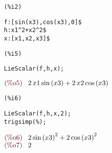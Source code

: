 \noindent
\begin{minipage}[t]{8ex}
\color{red}\bf
\begin{verbatim}
(%i2) 
\end{verbatim}
\end{minipage}
\begin{minipage}[t]{\textwidth}
\color{blue}
\begin{verbatim}
f:[sin(x3),cos(x3),0]$
h:x1^2+x2^2$
x:[x1,x2,x3]$
\end{verbatim}
\end{minipage}

\smallskip

\noindent
\begin{minipage}[t]{8ex}
\color{red}\bf
\begin{verbatim}
(%i5) 
\end{verbatim}
\end{minipage}
\begin{minipage}[t]{\textwidth}
\color{blue}
\begin{verbatim}
LieScalar(f,h,x);
\end{verbatim}
\end{minipage}
\begin{math}\displaystyle
\parbox{8ex}{\color{labelcolor}(\%o5) }
2\,x1\,\mathrm{sin}\left( x3\right) +2\,x2\,\mathrm{cos}\left( x3\right) 
\end{math}


\noindent
\begin{minipage}[t]{8ex}
\color{red}\bf
\begin{verbatim}
(%i6) 
\end{verbatim}
\end{minipage}
\begin{minipage}[t]{\textwidth}
\color{blue}
\begin{verbatim}
LieScalar(f,h,x,2);
trigsimp(%);
\end{verbatim}
\end{minipage}
\begin{math}\displaystyle
\parbox{8ex}{\color{labelcolor}(\%o6) }
2\,{\mathrm{sin}\left( x3\right) }^{2}+2\,{\mathrm{cos}\left( x3\right) }^{2}
\end{math}\\
\begin{math}\displaystyle
\parbox{8ex}{\color{labelcolor}(\%o7) }
2
\end{math}


